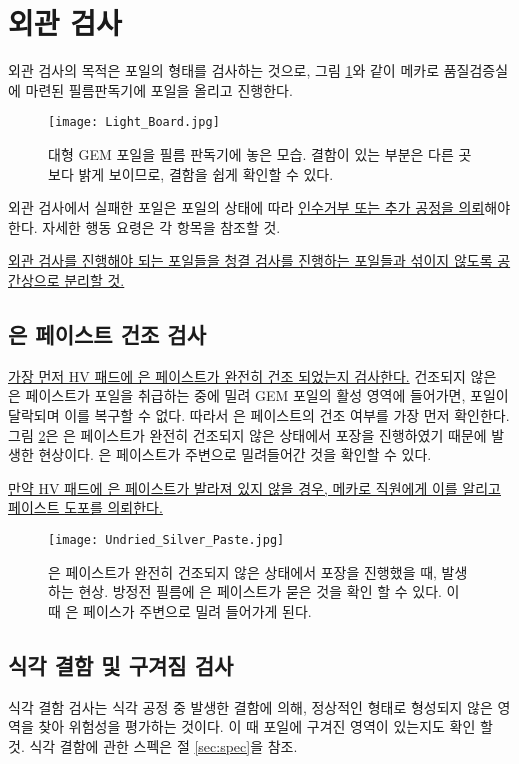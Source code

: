 \section{외관 검사}
외관 검사의 목적은 포일의 형태를 검사하는 것으로, 그림 \ref{fig:light_board}와 같이 메카로 품질검증실에 마련된 필름판독기에 포일을 올리고 진행한다.

\begin{figure}[htb]
  \centering
  \texttt{[image: Light\_Board.jpg]}
  \caption[대형 GEM 포일을 필름 판독기에 놓은 모습]{대형 GEM 포일을 필름 판독기에 놓은 모습. 결함이 있는 부분은 다른 곳보다 밝게 보이므로, 결함을 쉽게 확인할 수 있다.}
  \label{fig:light_board}
\end{figure}

외관 검사에서 실패한 포일은 포일의 상태에 따라 \uline{인수거부 또는 추가 공정을 의뢰}해야 한다. 자세한 행동 요령은 각 항목을 참조할 것.

\uline{외관 검사를 진행해야 되는 포일들을 청결 검사를 진행하는 포일들과 섞이지 않도록 공간상으로 분리할 것.} 

\subsection{은 페이스트 건조 검사}
\uline{가장 먼저 HV 패드에 은 페이스트가 완전히 건조 되었는지 검사한다.} 건조되지 않은 은 페이스트가 포일을 취급하는 중에 밀려 GEM 포일의 활성 영역에 들어가면, 포일이 달락되며 이를 복구할 수 없다. 따라서 은 페이스트의 건조 여부를 가장 먼저 확인한다. 그림 \ref{fig:undried_paste}은 은 페이스트가 완전히 건조되지 않은 상태에서 포장을 진행하였기 때문에 발생한 현상이다. 은 페이스트가 주변으로 밀려들어간 것을 확인할 수 있다.

\uline{만약 HV 패드에 은 페이스트가 발라져 있지 않을 경우, 메카로 직원에게 이를 알리고 페이스트 도포를 의뢰한다.}

\begin{figure}[htb]
  \centering
  \texttt{[image: Undried\_Silver\_Paste.jpg]}
  \caption[건조되지 않은 은 페이스트]{은 페이스트가 완전히 건조되지 않은 상태에서 포장을 진행했을 때, 발생하는 현상. 방정전 필름에 은 페이스트가 묻은 것을 확인 할 수 있다. 이 때 은 페이스가 주변으로 밀려 들어가게 된다.}
  \label{fig:undried_paste}
\end{figure}

\subsection{식각 결함 및 구겨짐 검사}
식각 결함 검사는 식각 공정 중 발생한 결함에 의해, 정상적인 형태로 형성되지 않은 영역을 찾아 위험성을 평가하는 것이다. 이 때 포일에 구겨진 영역이 있는지도 확인 할 것. 식각 결함에 관한 스펙은 절 \ref{sec:spec}을 참조.

